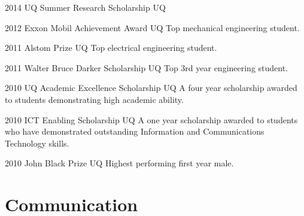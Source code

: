 \documentclass[]{friggeri-cv} %
\begin{document}
\begin{entrylist}
\entryInlineSmall
{2014}
{UQ Summer Research Scholarship}
{UQ}
{}
\end{entrylist}
\begin{entrylist}
\entryInlineSmall
{2012}
{Exxon Mobil Achievement Award}
{UQ}
{Top mechanical engineering student.}
\end{entrylist}
\begin{entrylist}
\entryInlineSmall
{2011}
{Alstom Prize}
{UQ}
{Top electrical engineering student.}
\end{entrylist}
\begin{entrylist}
\entryInlineSmall
{2011}
{Walter Bruce Darker Scholarship}
{UQ}
{Top 3rd year engineering student.}
\end{entrylist}
\begin{entrylist}
\entryInlineSmall
{2010}
{UQ Academic Excellence Scholarship}
{UQ}
{A four year scholarship awarded to students demonstrating high academic ability.}
\end{entrylist}
\begin{entrylist}
\entryInlineSmall
{2010}
{ICT Enabling Scholarship}
{UQ}
{A one year scholarship awarded to students who have demonstrated outstanding Information and Communications Technology skills.}
\end{entrylist}
\begin{entrylist}
\entryInlineSmall
{2010}
{John Black Prize}
{UQ}
{Highest performing first year male.}
\end{entrylist}

\section{Communication}
\end{document}
